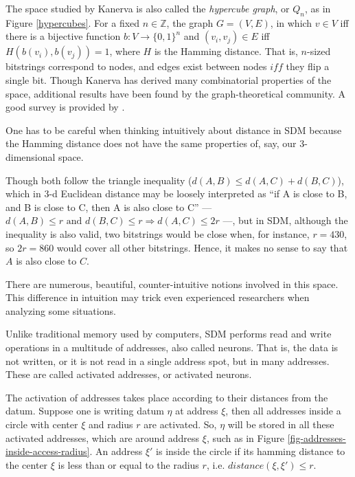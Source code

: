 The space studied by Kanerva is also called the \emph{hypercube graph}, or $Q_n$, as in Figure \ref{hypercubes}. For a fixed $n \in \mathbb{Z}$, the graph $G = (V, E)$, in which $v \in V$ iff there is a bijective function $b: V\to \{0,1\}^n$ and $(v_i, v_j) \in E$ iff $H(b(v_i), b(v_j))=1$, where $H$ is the Hamming distance. That is, $n$-sized bitstrings correspond to nodes, and edges exist between nodes $iff$ they flip a single bit.  Though Kanerva has derived many combinatorial properties of the space, additional results have been found by the graph-theoretical community. A good survey is provided by \citet{harary1988survey}.

One has to be careful when thinking intuitively about distance in SDM because the Hamming distance does not have the same properties of, say, our 3-dimensional space.

Though both follow the triangle inequality ($d(A, B) \le d(A, C) + d(B, C)$), which in 3-d Euclidean distance may be loosely interpreted as ``if A is close to B, and B is close to C, then A is also close to C'' --- $d(A, B) \le r \text{ and } d(B, C) \le r \Rightarrow d(A, C) \le 2r$ ---, but in SDM, although the inequality is also valid, two bitstrings would be close when, for instance, $r = 430$, so $2r = 860$ would cover all other bitstrings. Hence, it makes no sense to say that $A$ is also close to $C$.

There are numerous, beautiful, counter-intuitive notions involved in this space. This difference in intuition may trick even experienced researchers when analyzing some situations.



















Unlike traditional memory used by computers, SDM performs read and write operations in a multitude of addresses, also called neurons.  That is, the data is not written, or it is not read in a single address spot, but in many addresses. These are called activated addresses, or activated neurons.

The activation of addresses takes place according to their distances from the datum. Suppose one is writing datum $\eta$ at address $\xi$, then all addresses inside a circle with center $\xi$ and radius $r$ are activated. So, $\eta$ will be stored in all these activated addresses, which are around address $\xi$, such as in Figure \ref{fig-addresses-inside-access-radius}.  An address $\xi'$ is inside the circle if its hamming distance to the center $\xi$ is less than or equal to the radius $r$, i.e. $distance(\xi,\xi')\leq r$.

